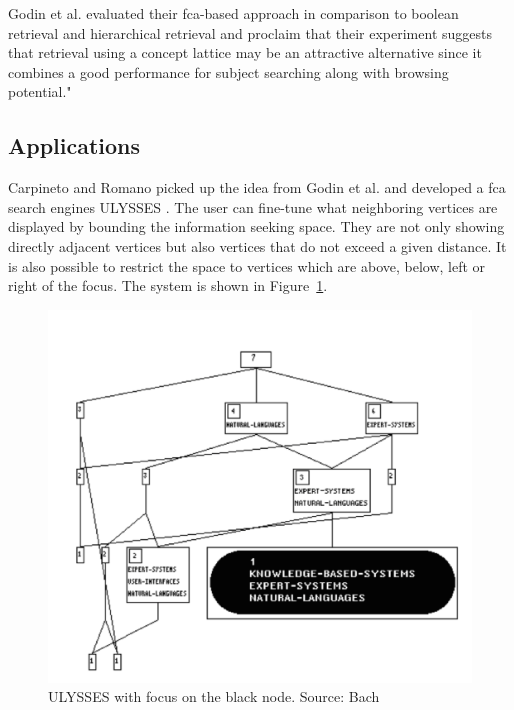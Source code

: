 \documentclass[11pt]{report}
\begin{document}
Godin et al. \cite{Godin1993} evaluated their \acrshort{fca}-based approach in comparison to boolean retrieval and hierarchical retrieval and proclaim that their experiment suggests that retrieval using a concept lattice may be an attractive alternative since it combines a good performance for subject searching along with browsing potential."

\subsection{Applications}
Carpineto and Romano picked up the idea from Godin et al. and developed a \acrshort{fca} search engines ULYSSES \cite{Carpineto1995,Carpineto1996}. The user can fine-tune what neighboring vertices are displayed by bounding the information seeking space. They are not only showing directly adjacent vertices but also vertices that do not exceed a given distance. It is also possible to restrict the space to vertices which are above, below, left or right of the focus. The system is shown in Figure~\ref{figure:ulysses}. \\

\begin{figure}[!ht]
	\centering
	\includegraphics[width=\linewidth]{images/ulysses}
\caption{ULYSSES with focus on the black node. Source: Bach \cite{Bach2010} }
\label{figure:ulysses}
\end{figure}
\end{document}
